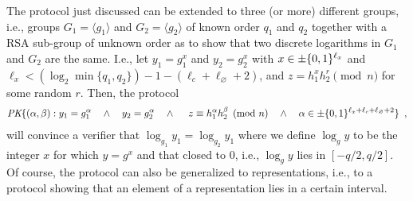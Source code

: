 The protocol just discussed can be extended to three (or more) different groups, i.e., 
groups $G_1 = \langle g_1 \rangle$  and $G_2 = \langle g_2 \rangle$  of known order
$q_1$ and $q_2$ together with a RSA sub-group of unknown order as to show that two 
discrete logarithms in $G_1$ and $G_2$ are the same.
I.e., let $y_1 = g_1^x$ and $y_2 = g_2^x$ with $x \in \pm\{0,1\}^{\ell_x}$ and
 $\ell_x < (\log_2 \min\{q_1,q_2\}) - 1 - ( \ell_c 
+ \ell_\varnothing + 2) $, and $z = h_1^x h_2^r \pmod{n}$ for some random $r$.
Then, the protocol
\begin{multline*}
\textit{PK}\{(\alpha,\beta ): y_1 = g_1^\alpha  
\quad \wedge \quad 
y_2 = g_2^\alpha  
\quad \wedge \quad  \
 z \equiv h_1^\alpha h_2^\beta \pmod{n}  \quad \wedge \quad 
\alpha \in  \pm\{0,1\}^{\ell_x+\ell_c + \ell_\varnothing+2}\}\enspace,
\end{multline*}
will convince a verifier that $\log_{g_1} y_1 = \log_{g_2} y_1 $ 
where we define $\log_g y$ to be the integer $x$ for which $y=g^x$
and that closed to $0$, i.e.,  $\log_g y$ lies in $[-q/2,q/2]$.
Of course, the protocol can also be generalized to representations, i.e., to a protocol
showing that an element of a representation lies in a certain interval.


